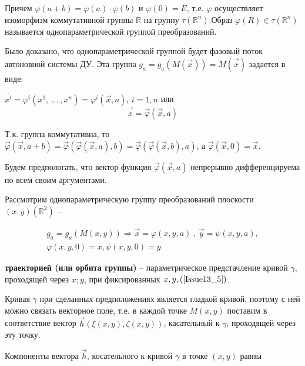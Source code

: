 Причем $\varphi(a+b) = \varphi(a)\cdot \varphi(b)$ и $\varphi(0) = E$, т.е. $\varphi$ осуществляет изоморфизм коммутативной группы $\mathbb{R}$ на группу $\tau(\mathbb{R}^n)$.Образ $\varphi(R) \in \tau(\mathbb{R}^n)$ называется однопараметрической группой преобразований.

Было доказано, что однопараметрической группой будет фазовый поток автоновной системы ДУ. Эта группа $g_a = g_a(M(\vec{x})) = M(\overrightarrow{\overline{x}})$ задается в виде:

$\overline{x^i} = \varphi^i(x^1,\ \dots\ ,x^n) = \varphi^i(\vec{x}, a)$, $i = \overline{1, n}$ или 
\begin{equation}
	\overrightarrow{\overline{x}} = \vec{\varphi}(\vec{x}, a)
	\label{Issue13_4}
\end{equation}

Т.к. группа коммутативна, то $\vec{\varphi}(\vec{x}, a + b) = \vec{\varphi}(\vec{\varphi}(\vec{x}, a), b) = \vec{\varphi}(\vec{\varphi}(\vec{x}, b), a)$, а $\vec{\varphi}(\vec{x}, 0) = \vec{x}$.

Будем предпологать, что вектор-функция $\vec{\varphi}(\vec{x}, a)$ непрерывно дифференцируема по всем своим аргументами.

Рассмотрим однопараметрическую группу преобразований плоскости $(x,y)(\mathbb{R}^2)$ --

\begin{equation}
	\begin{gathered}
		g_a = g_a(M(x,y)) \Rightarrow \vec{x} = \varphi(x,y,a)\ ,\ \vec{y} = \psi(x,y,a),\\
		\varphi(x,y,0) = x, \psi(x,y,0) = y
	\end{gathered}	
	\label{Issue13_5}
\end{equation}


\begin{definition}

\textbf{траекторией (или орбита группы)} -- параметрическое предстачление кривой $\gamma$, проходящей через $x;y$, при фиксированных $x,y,(\ref{Issue13_5})$.

\end{definition}


Кривая $\gamma$ при сделанных предположениях является гладкой кривой, поэтому с ней можно связать векторное поле, т.е. в каждой точке $M(x,y)$ поставим в соответствие вектор $\vec{h}(\xi(x,y), \zeta(x,y))$, касательный к $\gamma$, проходящей через эту точку.

Компоненты вектора $\vec{h}$, косательного к кривой $\gamma$ в точке $(x,y)$ равны

